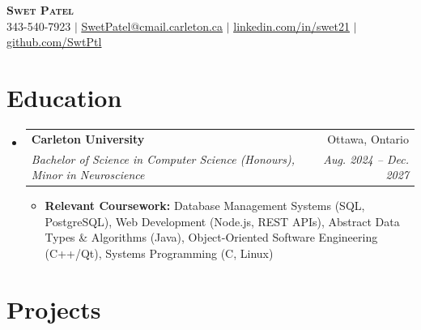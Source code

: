 \documentclass[letterpaper,11pt]{article}
\makeatletter
\newcommand{\resumeItem}[1]{
  \item\small{
    {#1 \vspace{-2pt}}
  }
}
\newcommand{\resumeSubheading}[4]{
  \vspace{-2pt}\item
    \begin{tabular*}{0.97\textwidth}[t]{l@{\extracolsep{\fill}}r}
      \textbf{#1} & #2 \\
      \textit{\small#3} & \textit{\small #4} \\
    \end{tabular*}\vspace{-7pt}
}
\newcommand{\resumeSubHeadingListStart}{\begin{itemize}[leftmargin=0.15in, label={}]}
\newcommand{\resumeSubHeadingListEnd}{\end{itemize}}
\newcommand{\resumeItemListStart}{\begin{itemize}}
\newcommand{\resumeItemListEnd}{\end{itemize}\vspace{-5pt}}
\makeatother
\begin{document}
\begin{center}
    \textbf{\Huge \scshape Swet Patel} \\ \vspace{1pt}
    \small 343-540-7923 $|$ \href{mailto:SwetPatel@cmail.carleton.ca}{\underline{SwetPatel@cmail.carleton.ca}} $|$
    \href{https://linkedin.com/in/swet21}{\underline{linkedin.com/in/swet21}} $|$
    \href{https://github.com/SwtPtl}{\underline{github.com/SwtPtl}}
\end{center}


\section{Education}
\resumeSubHeadingListStart
\resumeSubheading
{Carleton University}{Ottawa, Ontario}
{Bachelor of Science in Computer Science (Honours), Minor in Neuroscience}{Aug. 2024 -- Dec. 2027}
\resumeItemListStart
\resumeItem{\textbf{Relevant Coursework:} Database Management Systems (SQL, PostgreSQL), Web Development (Node.js, REST APIs), Abstract Data Types \& Algorithms (Java), Object-Oriented Software Engineering (C++/Qt), Systems Programming (C, Linux)}
\resumeItemListEnd
\resumeSubHeadingListEnd


\section{Projects}
\end{document}
